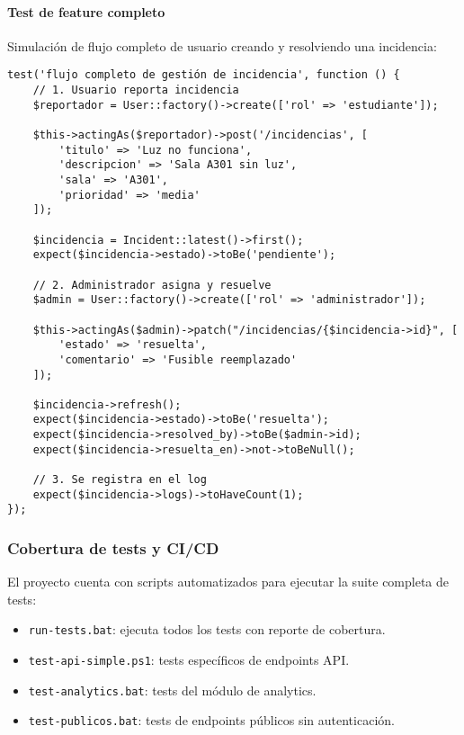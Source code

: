 \paragraph{Test de feature completo}

Simulación de flujo completo de usuario creando y resolviendo una incidencia:

\begin{verbatim}
test('flujo completo de gestión de incidencia', function () {
    // 1. Usuario reporta incidencia
    $reportador = User::factory()->create(['rol' => 'estudiante']);
    
    $this->actingAs($reportador)->post('/incidencias', [
        'titulo' => 'Luz no funciona',
        'descripcion' => 'Sala A301 sin luz',
        'sala' => 'A301',
        'prioridad' => 'media'
    ]);
    
    $incidencia = Incident::latest()->first();
    expect($incidencia->estado)->toBe('pendiente');
    
    // 2. Administrador asigna y resuelve
    $admin = User::factory()->create(['rol' => 'administrador']);
    
    $this->actingAs($admin)->patch("/incidencias/{$incidencia->id}", [
        'estado' => 'resuelta',
        'comentario' => 'Fusible reemplazado'
    ]);
    
    $incidencia->refresh();
    expect($incidencia->estado)->toBe('resuelta');
    expect($incidencia->resolved_by)->toBe($admin->id);
    expect($incidencia->resuelta_en)->not->toBeNull();
    
    // 3. Se registra en el log
    expect($incidencia->logs)->toHaveCount(1);
});
\end{verbatim}

\subsubsection{Cobertura de tests y CI/CD}

El proyecto cuenta con scripts automatizados para ejecutar la suite completa de tests:

\begin{itemize}
    \item \texttt{run-tests.bat}: ejecuta todos los tests con reporte de cobertura.
    \item \texttt{test-api-simple.ps1}: tests específicos de endpoints API.
    \item \texttt{test-analytics.bat}: tests del módulo de analytics.
    \item \texttt{test-publicos.bat}: tests de endpoints públicos sin autenticación.
\end{itemize}

